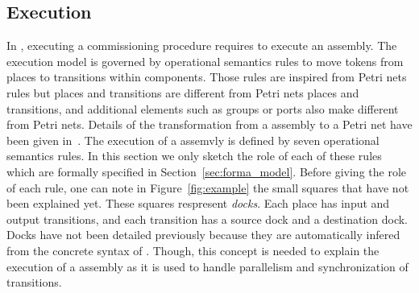 

\subsection{Execution}

In \mad, executing a commissioning procedure requires to execute an
assembly. 
The \mad execution model is governed by operational semantics rules to
move tokens from places to transitions within components. Those rules
are inspired from Petri nets rules but \mad places and transitions
are different from Petri nets places and transitions, and additional
elements such as groups or ports also make \mad different from
Petri nets. Details of the transformation from a \mad assembly to a
Petri net have been given in~\cite{}. The execution of a \mad assemvly
is defined by seven operational semantics rules. In this section we only
sketch the role of each of these rules which are formally specified in
Section~\ref{sec:forma_model}. Before giving the role of each rule,
one can note in Figure~\ref{fig:example} the small squares that
have not been explained yet. These squares respresent \emph{docks}. Each
place has input and output transitions, and each transition has a
source dock and a destination dock. Docks have not been detailed
previously because they are automatically infered from the concrete
syntax of \mad. Though, this concept is needed to explain the
execution of a \mad assembly as it is used to handle parallelism and
synchronization of transitions.
%
